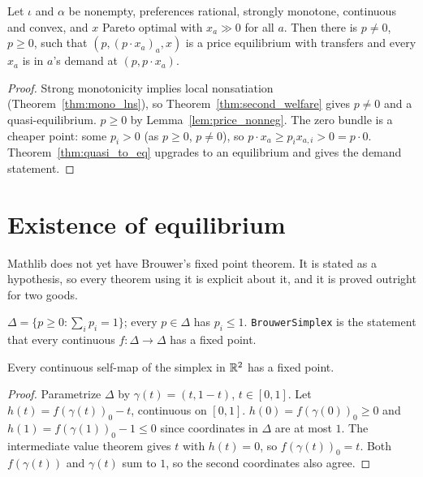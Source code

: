\begin{theorem}
\label{thm:second_welfare_demand}
\leanok
{}
Let $\iota$ and $\alpha$ be nonempty, preferences rational, strongly monotone, continuous and convex, and $x$ Pareto
optimal with $x_a \gg 0$ for all $a$. Then there is $p \neq 0$, $p \ge 0$, such that $(p, (p \cdot x_a)_a, x)$ is a
price equilibrium with transfers and every $x_a$ is in $a$'s demand at $(p, p \cdot x_a)$.
\end{theorem}
\begin{proof}
\leanok
Strong monotonicity implies local nonsatiation (Theorem~\ref{thm:mono_lns}), so Theorem~\ref{thm:second_welfare} gives
$p \neq 0$ and a quasi-equilibrium. $p \ge 0$ by Lemma~\ref{lem:price_nonneg}. The zero bundle is a cheaper point: some
$p_i > 0$ (as $p \ge 0$, $p \neq 0$), so $p \cdot x_a \ge p_i x_{a,i} > 0 = p \cdot 0$. Theorem~\ref{thm:quasi_to_eq}
upgrades to an equilibrium and gives the demand statement.
\end{proof}

\section{Existence of equilibrium}
\label{sec:ge_existence}

Mathlib does not yet have Brouwer's fixed point theorem. It is stated as a hypothesis, so every theorem using it is
explicit about it, and it is proved outright for two goods.

\begin{definition}
\label{def:priceSimplex}
\leanok
$\Delta = \{p \ge 0 : \sum_i p_i = 1\}$; every $p \in \Delta$ has $p_i \le 1$. \texttt{BrouwerSimplex} is the statement
that every continuous $f : \Delta \to \Delta$ has a fixed point.
\end{definition}

\begin{theorem}
\label{thm:brouwer_two}
\leanok
{}
Every continuous self-map of the simplex in $\mathbb{R}^2$ has a fixed point.
\end{theorem}
\begin{proof}
\leanok
Parametrize $\Delta$ by $\gamma(t) = (t, 1 - t)$, $t \in [0, 1]$. Let $h(t) = f(\gamma(t))_0 - t$, continuous on
$[0, 1]$. $h(0) = f(\gamma(0))_0 \ge 0$ and $h(1) = f(\gamma(1))_0 - 1 \le 0$ since coordinates in $\Delta$ are at most
$1$. The intermediate value theorem gives $t$ with $h(t) = 0$, so $f(\gamma(t))_0 = t$. Both $f(\gamma(t))$ and
$\gamma(t)$ sum to $1$, so the second coordinates also agree.
\end{proof}

